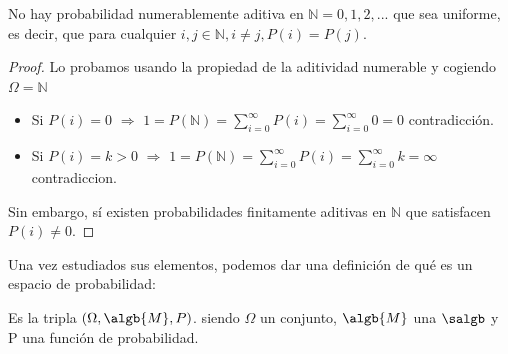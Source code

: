 \documentclass{apuntes}
\begin{document}
\obs No hay probabilidad numerablemente aditiva en $\mathbb{N}={0,1,2,...}$ que sea uniforme, es decir, que para cualquier $i,j \in \mathbb{N}, i \neq j, P({i}) = P({j})$. 

\begin{proof}
Lo probamos usando la propiedad de la aditividad numerable y cogiendo $\Omega = \mathbb{N}$
\begin{itemize}
\item Si $P({i})=0$ $\Rightarrow$ $1=P(\mathbb{N})= \sum_{i=0}^{\infty}P({i})= \sum_{i=0}^{\infty}0=0$  contradicción. 
\item Si $P({i})=k>0$ $\Rightarrow$ $1=P(\mathbb{N})= \sum_{i=0}^{\infty}P({i})=\sum_{i=0}^{\infty}k = \infty$  contradiccion. 
\end{itemize}
Sin embargo, sí existen probabilidades finitamente aditivas en $\mathbb{N}$ que satisfacen $P({i}) \neq 0$.
\end{proof}

Una vez estudiados sus elementos, podemos dar una definición de qué es un espacio de probabilidad:

\begin{defn} Es la tripla $(\Omega, \algb{M}, P)$. siendo $\Omega$ un conjunto, $\algb{M}$ una $\salgb$ y P una función de probabilidad.
\end{defn}
\end{document}
